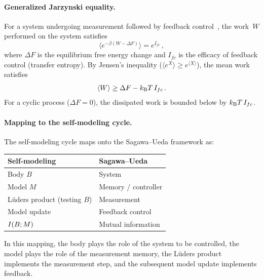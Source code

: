\paragraph{Generalized Jarzynski equality.}
For a system undergoing measurement followed by feedback
control~\cite{SagawaUeda2010}, the work~$W$ performed on the system
satisfies
\begin{equation}
  \bigl\langle e^{-\beta(W - \Delta F)} \bigr\rangle = e^{I_{fc}} \,,
  \label{eq:gen-jarzynski}
\end{equation}
where $\Delta F$ is the equilibrium free energy change and $I_{fc}$ is
the efficacy of feedback control (transfer entropy).  By Jensen's
inequality ($\langle e^X \rangle \geq e^{\langle X\rangle}$), the
mean work satisfies
\begin{equation}
  \langle W \rangle \geq \Delta F - k_{\mathrm{B}} T\,I_{fc} \,.
  \label{eq:su-mean}
\end{equation}
For a cyclic process ($\Delta F = 0$), the dissipated work is bounded
below by $k_{\mathrm{B}} T\,I_{fc}$.

\paragraph{Mapping to the self-modeling cycle.}
The self-modeling cycle maps onto the Sagawa--Ueda framework as:

\smallskip
\begin{center}
\begin{tabular}{@{}ll@{}}
  \toprule
  Self-modeling & Sagawa--Ueda \\
  \midrule
  Body $B$ & System \\
  Model $M$ & Memory / controller \\
  Lüders product (testing $B$) & Measurement \\
  Model update & Feedback control \\
  $I(B;M)$ & Mutual information \\
  \bottomrule
\end{tabular}
\end{center}
\smallskip

\noindent
In this mapping, the body plays the role of the system to be
controlled, the model plays the role of the measurement memory, the
Lüders product~\cite{Paper5} implements the measurement step, and the
subsequent model update implements feedback.

